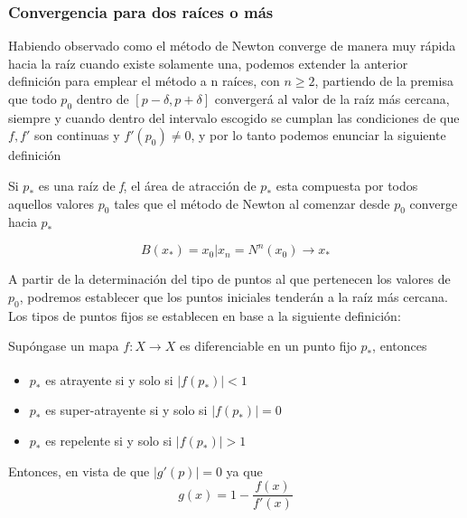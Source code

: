 \subsubsection{Convergencia para dos raíces o más}

Habiendo observado como el método de Newton converge de manera muy rápida hacia la raíz cuando existe solamente una, podemos extender la anterior definición para emplear el método a n raíces, con $n \geq 2$, partiendo de la premisa que todo $p_0$ dentro de $[p-\delta, p+\delta]$ convergerá al valor de la raíz más cercana, siempre y cuando dentro del intervalo escogido se cumplan las condiciones de que $f,f'$ son continuas y $f'(p_0) \neq 0$, y por lo tanto podemos enunciar la siguiente definición

\begin{definition}

Si $p_*$ es una raíz de \textit{f}, el área de atracción de $p_*$ esta compuesta por todos aquellos valores $p_0$ tales que el método de Newton al comenzar desde $p_0$ converge hacia $p_*$

\begin{displaymath}
B(x_*) = {x_0|x_n =  N^n(x_0) \xrightarrow{}  x_*}
\end{displaymath}

\end{definition}

A partir de la determinación del tipo de puntos al que pertenecen los valores de $p_0$, podremos establecer que los puntos iniciales tenderán a la raíz más cercana. 
Los tipos de puntos fijos se establecen en base a la siguiente definición:

\begin{definition}
 Supóngase un mapa $f: X \xrightarrow[]{}X$ es diferenciable en un punto fijo $p_*$, entonces
 \begin{itemize}
     \item $p_*$ es atrayente si y solo si $|f(p_*)|<1$
     \item $p_*$ es super-atrayente si y solo si $|f(p_*)|=0$
     \item $p_*$ es repelente si y solo si $|f(p_*)|>1$
 \end{itemize}
\end{definition}

Entonces, en vista de que $|g'(p)| = 0$ ya que 
\begin{displaymath}
     g(x)= 1 - \frac{f(x)}{f'(x)} 
\end{displaymath}

